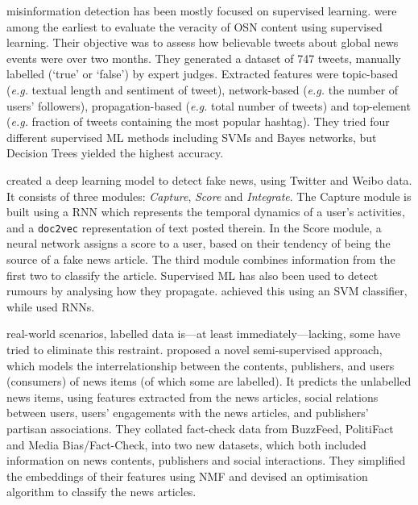  misinformation detection has been mostly focused on supervised learning.  were among the earliest to evaluate the veracity of \ac{OSN} content using supervised learning. Their objective was to assess how believable tweets about global news events were over two months. They generated a dataset of 747 tweets, manually labelled (`true' or `false') by expert judges. Extracted features were topic-based (\emph{e.g.} textual length and sentiment of tweet), network-based (\emph{e.g.} the number of users’ followers), propagation-based (\emph{e.g.} total number of tweets) and top-element (\emph{e.g.} fraction of tweets containing the most popular hashtag). They tried four different supervised \ac{ML} methods including \acp{SVM} and Bayes networks, but Decision Trees yielded the highest accuracy.

 created a deep learning model to detect fake news, using Twitter and Weibo data. It consists of three modules: \emph{Capture}, \emph{Score} and \emph{Integrate}. The Capture module is built using a \ac{RNN} which represents the temporal dynamics of a user’s activities, and a \texttt{doc2vec} representation of text posted therein. In the Score module, a neural network assigns a score to a user, based on their tendency of being the source of a fake news article. The third module combines information from the first two to classify the article. Supervised \ac{ML} has also been used to detect rumours by analysing how they propagate.  achieved this using an \ac{SVM} classifier, while  used \acp{RNN}.

 real-world scenarios, labelled data is—at least immediately—lacking, some have tried to eliminate this restraint.  proposed a novel semi-supervised approach, which models the interrelationship between the contents, publishers, and users (consumers) of news items (of which some are labelled). It predicts the unlabelled news items, using features extracted from the news articles, social relations between users, users' engagements with the news articles, and publishers’ partisan associations. They collated fact-check data from BuzzFeed, PolitiFact and Media Bias/Fact-Check, into two new datasets, which both included information on news contents, publishers and social interactions. They simplified the embeddings of their features using \ac{NMF} and devised an optimisation algorithm to classify the news articles.


